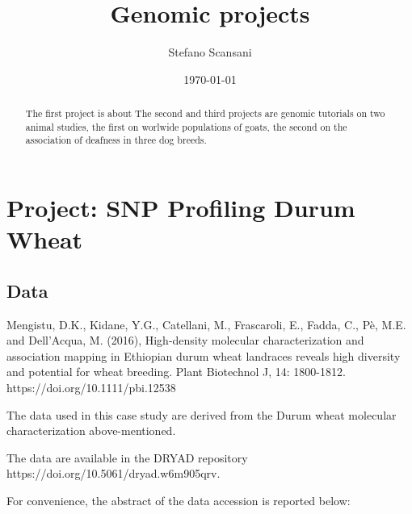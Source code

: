 \documentclass[a4paper,onecolumn,10pt]{article}
\begin{document}
\title{Genomic projects}
\author{Stefano Scansani}
\date{\today}
\maketitle
\begin{abstract}

    The first project is about
    The second and third projects are genomic tutorials on two animal studies, the first on worlwide populations of goats, the second on the association of deafness in three dog breeds.

\end{abstract}
\tableofcontents
\listoffigures
\listoftables



\section{Project: SNP Profiling Durum Wheat}

\subsection{Data}

Mengistu, D.K., Kidane, Y.G., Catellani, M., Frascaroli, E., Fadda, C., Pè, M.E. and Dell'Acqua, M. (2016), High-density molecular characterization and association mapping in Ethiopian durum wheat landraces reveals high diversity and potential for wheat breeding. Plant Biotechnol J, 14: 1800-1812. https://doi.org/10.1111/pbi.12538

The data used in this case study are derived from the  Durum wheat molecular characterization above-mentioned.

The data are available in the DRYAD repository https://doi.org/10.5061/dryad.w6m905qrv.

For convenience, the abstract of the data accession is reported below:
\end{document}
